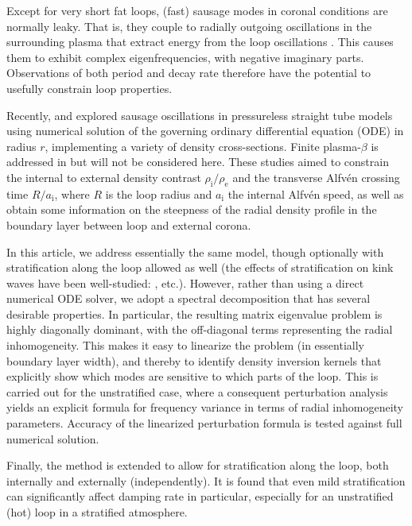 \documentclass[12pt]{iopart}
\begin{document}
Except for very short fat loops, (fast) sausage modes in coronal conditions are normally leaky. That is, they couple to radially outgoing oscillations in the surrounding plasma that extract energy from the loop oscillations \cite{Cal85aa,Cal86aa}. This causes them to exhibit complex eigenfrequencies, with negative imaginary parts. Observations of both period and decay rate therefore have the potential to usefully constrain loop properties.

Recently, \cite{CheLiXio15aa} and \cite{GuoCheLi16aa} explored sausage oscillations in pressureless straight tube models using numerical solution of the governing ordinary differential equation (ODE) in radius $r$, implementing a variety of density cross-sections. Finite plasma-$\beta$ is addressed in  \cite{CheLiXio16aa} but will not be considered here. These studies aimed to constrain the internal to external density contrast $\rho_\text{i}/\rho_\text{e}$ and the transverse Alfv\'en crossing time $R/a_\text{i}$, where $R$ is the loop radius and $a_\text{i}$ the internal Alfv\'en speed, as well as obtain some information on the steepness of the radial density profile in the boundary layer between loop and external corona. 

In this article, we address essentially the same model, though optionally with stratification along the loop allowed as well (the effects of stratification on kink waves have been well-studied: \cite{AndGooHol05aa,ErdVer07aa}, etc.). However, rather than using a direct numerical ODE solver, we adopt a spectral decomposition that has several desirable properties. In particular, the resulting matrix eigenvalue problem is highly diagonally dominant, with the off-diagonal terms representing the radial inhomogeneity. This makes it easy to linearize the problem (in essentially boundary layer width), and thereby to identify density inversion kernels that explicitly show which modes are sensitive to which parts of the loop. This is carried out for the unstratified case, where a consequent perturbation analysis yields an explicit formula for frequency variance in terms of radial inhomogeneity parameters. Accuracy of the linearized perturbation formula is tested against full numerical solution.

Finally, the method is extended to allow for stratification along the loop, both internally and externally (independently). It is found that even mild stratification can significantly affect damping rate in particular, especially for an unstratified (hot) loop in a stratified atmosphere.
\end{document}
